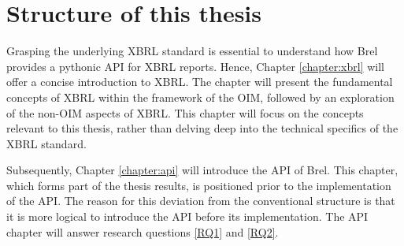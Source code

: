 \section{Structure of this thesis}

Grasping the underlying XBRL standard is essential to understand how Brel provides a pythonic API for XBRL reports.
Hence, Chapter \ref{chapter:xbrl} will offer a concise introduction to XBRL.
The chapter will present the fundamental concepts of XBRL within the framework of the OIM, followed by an exploration of the non-OIM aspects of XBRL.
This chapter will focus on the concepts relevant to this thesis, rather than delving deep into the technical specifics of the XBRL standard.

Subsequently, Chapter \ref{chapter:api} will introduce the API of Brel.
This chapter, which forms part of the thesis results, is positioned prior to the implementation of the API.
The reason for this deviation from the conventional structure is that it is more logical to introduce the API before its implementation.
The API chapter will answer research questions \ref{RQ1} and \ref{RQ2}.

